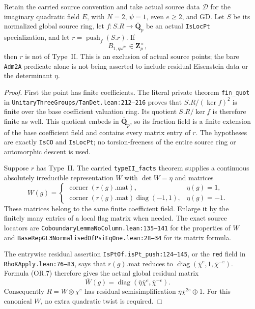 \begin{corollary}
Retain the carried source convention and take actual
source data $\mathcal D$ for the imaginary quadratic
field $E$, with $N=2$, $\psi=1$, even $e\ge2$, and
GD.  Let $S$ be its normalized global source ring,
let $f:S.R\to\overline{\mathbf Q}_p$ be an actual
\texttt{IsLocPt} specialization, and let
$r=\operatorname{push}_f(S.r)$.
If
\[
                     B_{1,\eta\omega^{2e}}
                              \in\mathbf Z_p^\times,     \tag{OR.6}
\]
then $r$ is not of Type~II.
This is an exclusion of actual source points;
the bare \texttt{Adm2A} predicate alone is not
being asserted to include residual Eisenstein
data or the determinant $\eta$.
\end{corollary}

\begin{proof}
First the point has finite coefficients.
The literal private theorem \texttt{fin\_quot}
in \texttt{UnitaryThreeGroups/TanDet.lean:212--216}
proves that $S.R/(\ker f)^2$ is finite over the
base coefficient valuation ring.  Its quotient
$S.R/\ker f$ is therefore finite as well.  This
quotient embeds in $\overline{\mathbf Q}_p$, so
its fraction field is a finite extension of the
base coefficient field and contains every matrix
entry of $r$.  The hypotheses are exactly
\texttt{IsCO} and \texttt{IsLocPt}; no
torsion-freeness of the entire source ring or
automorphic descent is used.

Suppose $r$ has Type~II.  The carried
\texttt{typeII\_facts} theorem supplies a
continuous absolutely irreducible representation
$W$ with $\det W=\eta$ and matrices
\[
 W(g)=
 \begin{cases}
  \operatorname{corner}(r(g).\mathrm{mat}),&\eta(g)=1,\\
  \operatorname{corner}(r(g).\mathrm{mat})
                   \operatorname{diag}(-1,1),&\eta(g)=-1.
 \end{cases}                                               \tag{OR.7}
\]
These matrices belong to the same finite
coefficient field.  Enlarge it by the finitely
many entries of a local flag matrix when needed.
The exact source locators are
\texttt{CoboundaryLemmaNoColumn.lean:135--141}
for the properties of $W$ and
\texttt{BaseRepGL3NormalisedOfPsiEqOne.lean:28--34}
for its matrix formula.

The entrywise residual assertion
\texttt{IsPtOf.isPt\_push:124--145}, or the
\texttt{red} field in
\texttt{RhoKApply.lean:76--83}, says that
$r(g).\mathrm{mat}$ reduces to
$\operatorname{diag}(\bar\chi^e,1,\bar\chi^{-e})$.
Formula (OR.7) therefore gives the actual global
residual matrix
\[
       \bar W(g)=
           \operatorname{diag}(\bar\eta\bar\chi^e,
                                      \bar\chi^{-e}).     \tag{OR.8}
\]
Consequently $R=W\otimes\chi^e$ has residual
semisimplification $\bar\eta\bar\chi^{2e}\oplus1$.
For this canonical $W$, no extra quadratic twist
is required.


\end{proof}
